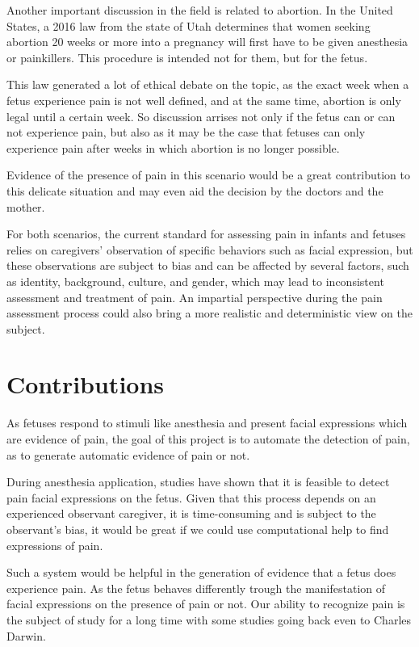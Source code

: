 \documentclass[msc]{ppgccufmg}
\begin{document}
Another important discussion in the field is related to abortion. In the United States, a 2016 law from the state of Utah determines that women seeking abortion 20 weeks or more into a pregnancy will first have to be given anesthesia or painkillers. This procedure is intended not for them, but for the fetus.

This law generated a lot of ethical debate on the topic, as the exact week when a fetus experience pain is not well defined, and at the same time, abortion is only legal until a certain week. So discussion arrises not only if the fetus can or can not experience pain, but also as it may be the case that fetuses can only experience pain after weeks in which abortion is no longer possible.

Evidence of the presence of pain in this scenario would be a great contribution to this delicate situation and may even aid the decision by the doctors and the mother.

For both scenarios, the current standard for assessing pain in infants and fetuses relies on caregivers’ observation of specific behaviors such as facial expression, but these observations are subject to bias and can be affected by several factors, such as identity, background, culture, and gender, which may lead to inconsistent assessment and treatment of pain. An impartial perspective during the pain assessment process could also bring a more realistic and deterministic view on the subject.

\section{Contributions}

As fetuses respond to stimuli like anesthesia and present facial expressions which are evidence of pain, the goal of this project is to automate the detection of pain, as to generate automatic evidence of pain or not. 

During anesthesia application, studies have shown that it is feasible to detect pain facial expressions on the fetus. Given that this process depends on an experienced observant caregiver, it is time-consuming and is subject to the observant's bias, it would be great if we could use computational help to find expressions of pain. 

Such a system would be helpful in the generation of evidence that a fetus does experience pain. As the fetus behaves differently trough the manifestation of facial expressions on the presence of pain or not. Our ability to recognize pain is the subject of study for a long time with some studies going back even to Charles Darwin.
\end{document}
